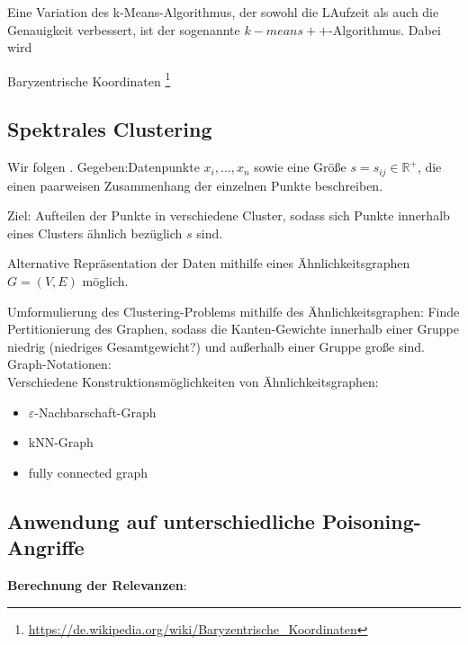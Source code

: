 \documentclass[11pt,a4paper]{article}
\numberwithin{equation}{section}
\begin{document}
	Eine Variation des k-Means-Algorithmus, der sowohl die LAufzeit als auch die Genauigkeit verbessert, ist der sogenannte $k-means++$-Algorithmus. Dabei wird 



	Baryzentrische Koordinaten \footnote{\url{https://de.wikipedia.org/wiki/Baryzentrische_Koordinaten}}
	
	\subsection{Spektrales Clustering}
	Wir folgen \cite{spectralClustering_tut}.
	Gegeben:Datenpunkte $x_i, ..., x_n$ sowie eine Größe $s = s_{ij} \in \mathbb{R}^{+}$, die einen paarweisen Zusammenhang der einzelnen Punkte beschreiben.
	
	Ziel: Aufteilen der Punkte in verschiedene Cluster, sodass sich Punkte innerhalb eines Clusters ähnlich bezüglich $s$ sind.
	
	Alternative Repräsentation der Daten mithilfe eines Ähnlichkeitsgraphen $G=(V,E)$ möglich.
	
	Umformulierung des Clustering-Problems mithilfe des Ähnlichkeitsgraphen: Finde Pertitionierung des Graphen, sodass die Kanten-Gewichte innerhalb einer Gruppe niedrig (niedriges Gesamtgewicht?) und außerhalb einer Gruppe große sind.\\
	
	
	Graph-Notationen:\\
	
	Verschiedene Konstruktionsmöglichkeiten von Ähnlichkeitsgraphen:
	
	\begin{itemize}
		\item $\varepsilon$-Nachbarschaft-Graph\\
		\item kNN-Graph\\
		\item fully connected graph
	\end{itemize}
	
	
	\subsection{Anwendung auf unterschiedliche Poisoning-Angriffe} \label{chapter_results} \label{chapter_experiments}
	\noindent \textbf{Berechnung der Relevanzen}:\\
	
\end{document}
